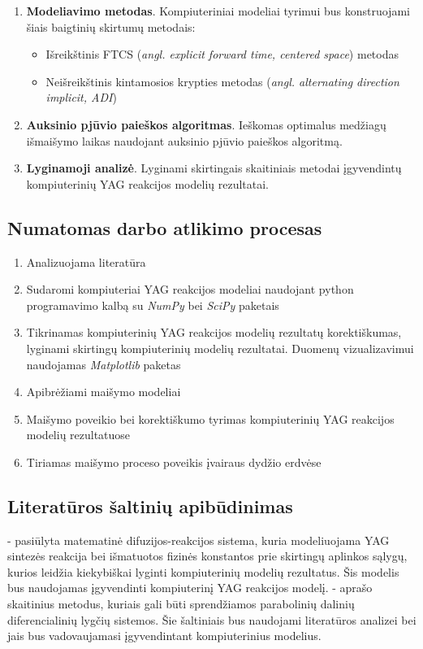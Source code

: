 \documentclass[]{VUMIFTemplateClass}
\begin{document}
\begin{enumerate}
    \item \textbf{Modeliavimo metodas}. Kompiuteriniai modeliai tyrimui bus konstruojami šiais baigtinių skirtumų metodais:
    \begin{itemize}
        \item Išreikštinis FTCS (\textit{angl. explicit forward time, centered space}) metodas
        \item Neišreikštinis kintamosios krypties metodas (\textit{angl. alternating direction implicit, ADI}) 
    \end{itemize}
    \item \textbf{Auksinio pjūvio paieškos algoritmas}. Ieškomas optimalus medžiagų išmaišymo laikas naudojant auksinio pjūvio paieškos algoritmą.
    \item \textbf{Lyginamoji analizė}. Lyginami skirtingais skaitiniais metodai įgyvendintų kompiuterinių YAG reakcijos modelių rezultatai. 
\end{enumerate}


\subsection{Numatomas darbo atlikimo procesas}

\begin{enumerate}
    \item Analizuojama literatūra 
    \item Sudaromi kompiuteriai YAG reakcijos modeliai naudojant python programavimo kalbą su \textit{NumPy} bei \textit{SciPy} paketais
    \item Tikrinamas kompiuterinių YAG reakcijos modelių rezultatų korektiškumas, lyginami skirtingų kompiuterinių modelių rezultatai. Duomenų vizualizavimui naudojamas \textit{Matplotlib} paketas
    \item Apibrėžiami maišymo modeliai
    \item Maišymo poveikio bei korektiškumo tyrimas kompiuterinių YAG reakcijos modelių rezultatuose 
    \item Tiriamas maišymo proceso poveikis įvairaus dydžio erdvėse
\end{enumerate}

\subsection{Literatūros šaltinių apibūdinimas}

\cite{ivanauskasComputationalModellingYAG2009,ivanauskasModellingSolidState2005,mackeviciusCloserLookComputer2012} - pasiūlyta matematinė difuzijos-reakcijos sistema, kuria modeliuojama YAG sintezės reakcija bei išmatuotos fizinės konstantos prie skirtingų aplinkos sąlygų, kurios leidžia kiekybiškai lyginti kompiuterinių modelių rezultatus. Šis modelis bus naudojamas įgyvendinti kompiuterinį YAG reakcijos modelį. \cite{pressNumericalRecipes3rd2007,levequeFiniteDifferenceMethods2007} - aprašo skaitinius metodus, kuriais gali būti sprendžiamos parabolinių dalinių diferencialinių lygčių sistemos. Šie šaltiniais bus naudojami literatūros analizei bei jais bus vadovaujamasi įgyvendintant kompiuterinius modelius.

\printbibliography[title = {Literatūra ir šaltiniai}]
\end{document}

